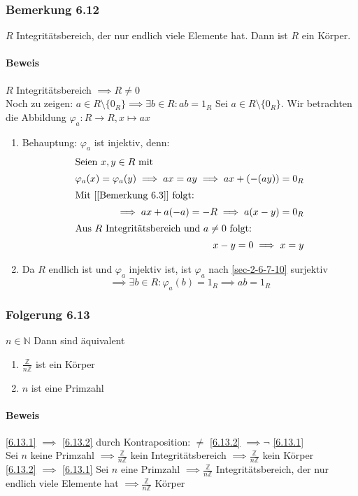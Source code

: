 \documentclass[a4paper]{scrartcl}
\theoremstyle{definition}
\theoremstyle{plain}
\theoremstyle{plain}
\theoremstyle{remark}
\theoremstyle{remark}
\theoremstyle{remark}
\theoremstyle{remark}
\theoremstyle{remark}
\begin{document}
\subsubsection{Bemerkung 6.12}
\label{sec-3-3-3}
$R$ Integritätsbereich, der nur endlich viele Elemente hat. Dann ist $R$ ein Körper.
\paragraph{Beweis}
\label{sec-3-3-3-1}
$R$ Integritätsbereich $\implies R\neq 0$ \\
         Noch zu zeigen: $a\in R\setminus\{0_R\} \implies \exists b\in R: a b = 1_R$
Sei $a\in R\setminus\{0_R\}$. Wir betrachten die Abbildung $\varphi_a: R\to R,x\mapsto a x$
\begin{enumerate}
\item Behauptung: $\varphi_a$ ist injektiv, denn:
\begin{align}
\intertext{Seien $x,y\in R$ mit}
\varphi_a(x) =\varphi_a(y) \implies a x = a y \implies a x + (-(a y)) = 0_R \\
\intertext{Mit [[Bemerkung 6.3]] folgt:}
\implies a x + a(-a) = -R \implies a(x - y) = 0_R  \\
\intertext{Aus $R$ Integritätsbereich und $a\neq 0$ folgt:}
x - y = 0 \implies x = y
\end{align}
\item Da $R$ endlich ist und $\varphi_a$ injektiv ist, ist $\varphi_a$ nach \ref{sec-2-6-7-10} surjektiv
\[\implies  \exists b\in R: \varphi_a(b) = 1_R \implies a b = 1_R\]
\end{enumerate}
\subsubsection{Folgerung 6.13}
\label{sec-3-3-4}
$n\in\mathbb{N}$ Dann sind äquivalent
\begin{enumerate}
\item \label{6.13.1} $\frac{\mathbb{Z}}{n\mathbb{Z}}$ ist ein Körper
\item \label{6.13.2} $n$ ist eine Primzahl
\end{enumerate}
\paragraph{Beweis}
\label{sec-3-3-4-1}
\ref{6.13.1} $\implies$ \ref{6.13.2} durch Kontraposition: $\neq$ \ref{6.13.2} $\implies \neg$ \ref{6.13.1} \\
         Sei $n$ keine Primzahl $\implies \frac{\mathbb{Z}}{n\mathbb{Z}}$ kein Integritätsbereich $\implies \frac{\mathbb{Z}}{n\mathbb{Z}}$ kein Körper \\
         \ref{6.13.2} $\implies$ \ref{6.13.1} Sei $n$ eine Primzahl $\implies \frac{\mathbb{Z}}{n\mathbb{Z}}$ Integritätsbereich, der nur endlich viele Elemente hat $\implies \frac{\mathbb{Z}}{n\mathbb{Z}}$ Körper
\end{document}
